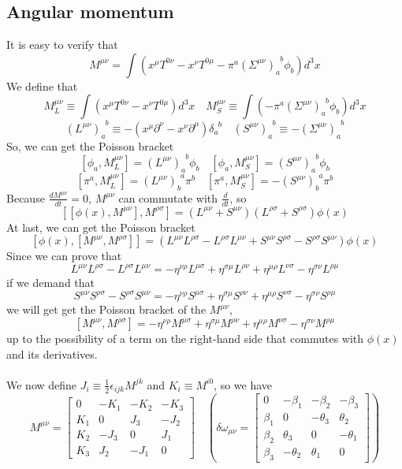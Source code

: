 \subsection{Angular momentum}

It is easy to verify that
\[M^{\mu \nu} = \int (x^{\mu}T^{0\nu}-x^{\nu}T^{0\mu}-\pi^a(\Sigma^{\mu \nu})_{a}^{\phantom{a}b}\phi_b) d^3 x\]
We define that
\[M_{L}^{\mu \nu} \equiv \int (x^{\mu}T^{0\nu}-x^{\nu}T^{0\mu}) d^3 x \quad M_S^{\mu \nu} \equiv \int (-\pi^a(\Sigma^{\mu \nu})_{a}^{\phantom{a}b}\phi_b) d^3 x\]
\[(L^{\mu \nu})_a^{\phantom{a}b} \equiv -(x^{\mu}\partial^{\nu}-x^{\nu}\partial^{\mu})\delta_a^{\phantom{a}b} \quad (S^{\mu \nu})_a^{\phantom{a}b} \equiv -(\Sigma^{\mu \nu})_a^{\phantom{a}b}\]
So, we can get the Poisson bracket
\[[\phi_a,M_L^{\mu \nu}] = (L^{\mu \nu})_a^{\phantom{a}b} \phi_b \quad [\phi_a,M_S^{\mu \nu}] = (S^{\mu \nu})_a^{\phantom{a}b} \phi_b\]
\[[\pi^a,M_L^{\mu \nu}] = (L^{\mu \nu})_b^{\phantom{b}a}\pi^{b}  \quad [\pi^a,M_S^{\mu \nu}] = - (S^{\mu \nu})_b^{\phantom{b}a} \pi^b \]
Because $\frac{d M^{\mu \nu}}{dt} = 0$, $M^{\mu \nu}$ can commutate with $\frac{d}{dt}$, so
\[[[\phi(x),M^{\mu \nu}],M^{\rho \sigma}] = (L^{\mu \nu}+S^{\mu \nu})(L^{\rho \sigma}+S^{\rho \sigma})\phi(x)\]
At last, we can get the Poisson bracket 
\[[\phi(x),[M^{\mu \nu},M^{\rho \sigma}]] = (L^{\mu \nu}L^{\rho \sigma}-L^{\rho \sigma}L^{\mu \nu} + S^{\mu \nu}S^{\rho \sigma}-S^{\rho \sigma}S^{\mu \nu})\phi(x)\]
Since we can prove that
\[L^{\mu \nu}L^{\rho \sigma}-L^{\rho \sigma}L^{\mu \nu} = -\eta^{\nu \rho}L^{\mu \sigma} + \eta^{\sigma \mu}L^{\rho \nu} + \eta^{\mu \rho}L^{\nu \sigma} - \eta^{\sigma \nu}L^{\rho \mu}\]
if we demand that
\[S^{\mu \nu}S^{\rho \sigma}-S^{\rho \sigma}S^{\mu \nu} = -\eta^{\nu \rho}S^{\mu \sigma} + \eta^{\sigma \mu}S^{\rho \nu} + \eta^{\mu \rho}S^{\nu \sigma} - \eta^{\sigma \nu}S^{\rho \mu}\]
we will get get the Poisson bracket of the $M^{\mu \nu}$,
\[[M^{\mu \nu},M^{\rho \sigma}] = -\eta^{\nu \rho}M^{\mu \sigma} + \eta^{\sigma \mu}M^{\rho \nu} + \eta^{\mu \rho}M^{\nu \sigma} - \eta^{\sigma \nu}M^{\rho \mu}\]
up to the possibility of a term on the right-hand side that commutes with $\phi(x)$ and its derivatives.\\ \\
We now define $J_i \equiv \frac{1}{2} \epsilon_{ijk} M^{jk}$ and $K_i \equiv M^{i0}$, so we have
\[M^{\mu \nu} = \left[ 
\begin{matrix} 
0   & -K_1 & -K_2 & -K_3 \\ 
K_1 & 0    & J_3  & -J_2 \\
K_2 & -J_3 & 0    &  J_1 \\
K_3 & J_2  & -J_1 &  0
\end{matrix} 
\right] \quad \left( 
\delta \omega_{\mu\nu} = \left[
\begin{matrix} 
0       & -\beta_1   & -\beta_2   & -\beta_3   \\ 
\beta_1 & 0         & -\theta_3 & \theta_2  \\
\beta_2 & \theta_3  & 0         & -\theta_1 \\
\beta_3 & -\theta_2 & \theta_1  & 0
\end{matrix} 
\right] \right)\] 

